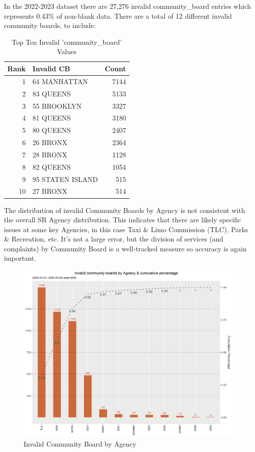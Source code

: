 \documentclass[12pt, titlepage]{article}
\begin{document}
	In the 2022-2023 dataset there are 27,276 invalid community\_board entries which represents 0.43\% of non-blank data. 
	There are a total of 12 different invalid community boards, to include: 
	
		\begin{table}[H]
		\centering
		\footnotesize
		\begin{tabular}{rlr}
		\toprule
		\textbf{Rank} & \textbf{Invalid CB} & \textbf{Count} \\
			\midrule
				1 & 64 MANHATTAN & 7144 \\
				2 & 83 QUEENS & 5133 \\
				3 & 55 BROOKLYN & 3327 \\
				4 & 81 QUEENS & 3180 \\
				5 & 80 QUEENS & 2407 \\
				6 & 26 BRONX & 2364 \\
				7 & 28 BRONX & 1128 \\
				8 & 82 QUEENS & 1054 \\
				9 & 95 STATEN ISLAND & 515 \\
				10 & 27 BRONX & 514 \\
			\bottomrule
		\end{tabular}
		\caption{Top Ten Invalid 'community\_board' Values}
		\end{table}
		
		The distribution of invalid Community Boards by Agency is not consistent with the overall SR Agency distribution. This indicates that there are likely
		specific issues at some key Agencies, in this case Taxi \& Limo Commission (TLC), Parks \& Recreation, etc. It's not a large error, but the division of services
		(and complaints) by Community Board is a well-tracked measure so accuracy is again important.

		\begin{figure}[H]
	 	 \centering
		  \includegraphics[scale = 0.65]{invalid_community_boards.png}
		  \caption{Invalid Community Board by Agency}
		  \label{fig:invalid_community_boards}
		\end{figure}
\end{document}
